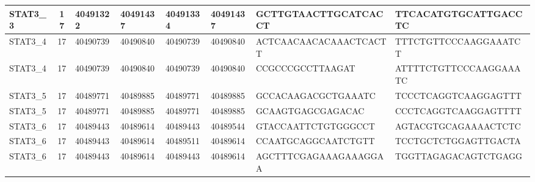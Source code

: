\begin{landscape}
\begin{longtable}{| p{} | p{} | p{} | p{} | p{} | p{} | p{} | p{} |}
\multicolumn{1}{|l|}{STAT3\_3}   & \multicolumn{1}{c|}{17} & \multicolumn{1}{l|}{40491322}  & \multicolumn{1}{l|}{40491437}  & \multicolumn{1}{l|}{40491334}  & \multicolumn{1}{l|}{40491437}  & \multicolumn{1}{l|}{GCTTGTAACTTGCATCACCT}            & \multicolumn{1}{l|}{TTCACATGTGCATTGACCTC}          \\ \hline
\multicolumn{1}{|l|}{STAT3\_4}   & \multicolumn{1}{c|}{17} & \multicolumn{1}{l|}{40490739}  & \multicolumn{1}{l|}{40490840}  & \multicolumn{1}{l|}{40490739}  & \multicolumn{1}{l|}{40490840}  & \multicolumn{1}{l|}{ACTCAACAACACAAACTCACTT}          & \multicolumn{1}{l|}{TTTCTGTTCCCAAGGAAATCT}         \\ \hline
\multicolumn{1}{|l|}{STAT3\_4}   & \multicolumn{1}{c|}{17} & \multicolumn{1}{l|}{40490739}  & \multicolumn{1}{l|}{40490840}  & \multicolumn{1}{l|}{40490739}  & \multicolumn{1}{l|}{40490840}  & \multicolumn{1}{l|}{CCGCCCGCCTTAAGAT}                & \multicolumn{1}{l|}{ATTTTCTGTTCCCAAGGAAATC}        \\ \hline
\multicolumn{1}{|l|}{STAT3\_5}   & \multicolumn{1}{c|}{17} & \multicolumn{1}{l|}{40489771}  & \multicolumn{1}{l|}{40489885}  & \multicolumn{1}{l|}{40489771}  & \multicolumn{1}{l|}{40489885}  & \multicolumn{1}{l|}{GCCACAAGACGCTGAAATC}             & \multicolumn{1}{l|}{TCCCTCAGGTCAAGGAGTTT}          \\ \hline
\multicolumn{1}{|l|}{STAT3\_5}   & \multicolumn{1}{c|}{17} & \multicolumn{1}{l|}{40489771}  & \multicolumn{1}{l|}{40489885}  & \multicolumn{1}{l|}{40489771}  & \multicolumn{1}{l|}{40489885}  & \multicolumn{1}{l|}{GCAAGTGAGCGAGACAC}               & \multicolumn{1}{l|}{CCCTCAGGTCAAGGAGTTTT}          \\ \hline
\multicolumn{1}{|l|}{STAT3\_6}   & \multicolumn{1}{c|}{17} & \multicolumn{1}{l|}{40489443}  & \multicolumn{1}{l|}{40489614}  & \multicolumn{1}{l|}{40489443}  & \multicolumn{1}{l|}{40489544}  & \multicolumn{1}{l|}{GTACCAATTCTGTGGGCCT}             & \multicolumn{1}{l|}{AGTACGTGCAGAAAACTCTC}          \\ \hline
\multicolumn{1}{|l|}{STAT3\_6}   & \multicolumn{1}{c|}{17} & \multicolumn{1}{l|}{40489443}  & \multicolumn{1}{l|}{40489614}  & \multicolumn{1}{l|}{40489511}  & \multicolumn{1}{l|}{40489614}  & \multicolumn{1}{l|}{CCAATGCAGGCAATCTGTT}             & \multicolumn{1}{l|}{TCCTGCTCTGGAGTTGACTA}          \\ \hline
\multicolumn{1}{|l|}{STAT3\_6}   & \multicolumn{1}{c|}{17} & \multicolumn{1}{l|}{40489443}  & \multicolumn{1}{l|}{40489614}  & \multicolumn{1}{l|}{40489443}  & \multicolumn{1}{l|}{40489614}  & \multicolumn{1}{l|}{AGCTTTCGAGAAAGAAAGGAA}           & \multicolumn{1}{l|}{TGGTTAGAGACAGTCTGAGG}          \\ \hline

\end{longtable}
\end{landscape}
